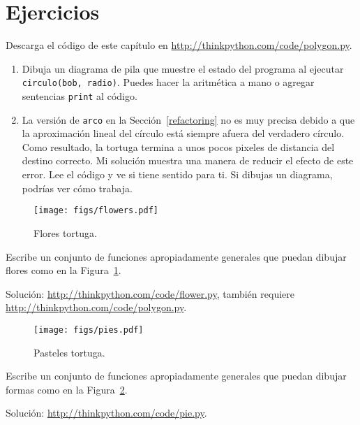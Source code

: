 \documentclass[10pt]{book}
\begin{document}
\section{Ejercicios}

\begin{exercise}

Descarga el código de este capítulo en
\url{http://thinkpython.com/code/polygon.py}.

\begin{enumerate}

\item Dibuja un diagrama de pila que muestre el estado del programa
al ejecutar {\tt circulo(bob, radio)}.  Puedes hacer la
aritmética a mano o agregar sentencias {\tt print} al código.

\item La versión de {\tt arco} en la Sección~\ref{refactoring} no es
muy precisa debido a que la aproximación lineal del
círculo está siempre afuera del verdadero círculo.  Como resultado,
la tortuga termina a unos pocos pixeles de distancia del destino
correcto.  Mi solución muestra una manera de reducir
el efecto de este error.  Lee el código y ve si
tiene sentido para ti.  Si dibujas un diagrama, podrías ver cómo trabaja.

\end{enumerate}

\end{exercise}

\begin{figure}
\centerline
{\texttt{[image: figs/flowers.pdf]}}
\caption{Flores tortuga.}
\label{fig.flowers}
\end{figure}

\begin{exercise}

Escribe un conjunto de funciones apropiadamente generales que
puedan dibujar flores como en la Figura~\ref{fig.flowers}.

Solución: \url{http://thinkpython.com/code/flower.py},
también requiere \url{http://thinkpython.com/code/polygon.py}.

\end{exercise}

\begin{figure}
\centerline
{\texttt{[image: figs/pies.pdf]}}
\caption{Pasteles tortuga.}
\label{fig.pies}
\end{figure}


\begin{exercise}

Escribe un conjunto de funciones apropiadamente generales que
puedan dibujar formas como en la Figura~\ref{fig.pies}.

Solución: \url{http://thinkpython.com/code/pie.py}.

\end{exercise}
\end{document}
